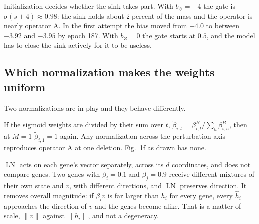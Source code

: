 Initialization decides whether the sink takes part. With $b_\varnothing=-4$ the gate is
$\sigma(s+4)\approx 0.98$: the sink holds about 2 percent of the mass and the operator is
nearly operator A. In the first attempt the bias moved from $-4.0$ to between $-3.92$ and
$-3.95$ by epoch 187. With $b_\varnothing=0$ the gate starts at $0.5$, and the model has to
close the sink actively for it to be useless.

\subsection{Which normalization makes the weights uniform}

Two normalizations are in play and they behave differently.

 If the sigmoid
weights are divided by their sum over $t$,
$\tilde\beta_{i,t}=\beta^{B}_{i,t}/\sum_u\beta^{B}_{i,u}$, then at $M=1$
$\tilde\beta_{i,1}=1$ again. Any normalization across the perturbation axis reproduces
operator A at one deletion. Fig.~1f as drawn has none.

 $\operatorname{LN}$ acts on each
gene's vector separately, across its $d$ coordinates, and does not compare genes. Two genes
with $\beta_i=0.1$ and $\beta_j=0.9$ receive different mixtures of their own state and
$v$, with different directions, and $\operatorname{LN}$ preserves direction. It removes
overall magnitude: if $\beta_iv$ is far larger than $h_i$ for every gene, every $\hat h_i$
approaches the direction of $v$ and the genes become alike. That is a matter of scale,
$\lVert v\rVert$ against $\lVert h_i\rVert$, and not a degeneracy.
